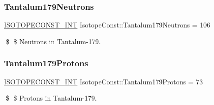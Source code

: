 \subsubsection{\texorpdfstring{Tantalum179\+Neutrons}{Tantalum179Neutrons}}
{\footnotesize\ttfamily \mbox{\hyperlink{group___isotope_const-_macros_ga5f18360b3e99483a35c32d789e62621c}{I\+S\+O\+T\+O\+P\+E\+C\+O\+N\+S\+T\+\_\+\+I\+NT}} Isotope\+Const\+::\+Tantalum179\+Neutrons = 106}

\$ \$ Neutrons in Tantalum-\/179. \mbox{\label{group___isotope_const-_tantalum-_ta179_gad62bc2af204b788876c4ee8be1ddddbd}} 
\subsubsection{\texorpdfstring{Tantalum179\+Protons}{Tantalum179Protons}}
{\footnotesize\ttfamily \mbox{\hyperlink{group___isotope_const-_macros_ga5f18360b3e99483a35c32d789e62621c}{I\+S\+O\+T\+O\+P\+E\+C\+O\+N\+S\+T\+\_\+\+I\+NT}} Isotope\+Const\+::\+Tantalum179\+Protons = 73}

\$ \$ Protons in Tantalum-\/179. 